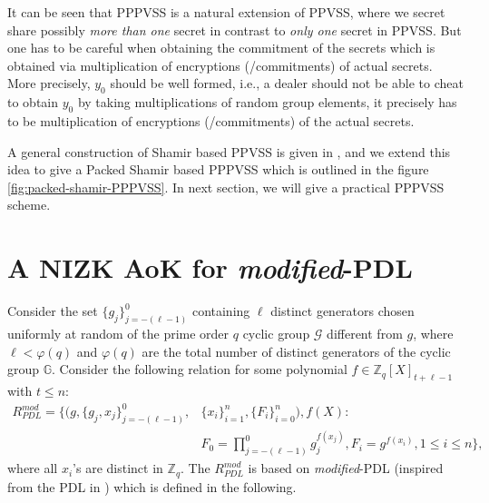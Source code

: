 It can be seen that PPPVSS is a natural extension of PPVSS, where we secret share possibly \textit{more than one} 
secret in contrast to \textit{only one} secret in PPVSS. But one has to be careful when obtaining the commitment 
of the secrets which is obtained via multiplication of encryptions (/commitments) of actual secrets. 
More precisely, $y_0$ should be well formed, i.e., a dealer should not be able to cheat to obtain $y_0$ by 
taking multiplications of random group elements, it precisely has to be multiplication of encryptions 
(/commitments) of the actual secrets.\par 

A general construction of Shamir based PPVSS is given in \cite{cryptoeprint:2025/576}, and we extend this idea 
to give a Packed Shamir based PPPVSS which is outlined in the figure \ref{fig:packed-shamir-PPPVSS}. 
In next section, we will give a practical PPPVSS scheme.



\section{A NIZK AoK for \textit{modified}-PDL}
\label{sec:aok_polynomial_dl}
Consider the set $\{g_j\}_{j=-(\ell-1)}^0$ containing $\ell$ distinct generators chosen uniformly at random of 
the prime order $q$ cyclic group $\mathcal{G}$ different from $g$, where $\ell<\varphi(q)$ and $\varphi(q)$ are 
the total number of distinct generators of the cyclic group $\mathbb{G}$. Consider the following relation for 
some polynomial $f\in\mathbb{Z}_q[X]_{t+\ell-1}$ with $t\leq n$:
\begin{align}\label{eq:relation_mod_PDL}
  R_{PDL}^{mod} = \{(g,\{g_j,x_j\}_{j=-(\ell-1)}^0,&\{x_i\}_{i=1}^n,\{F_i\}_{i=0}^n),f(X) :\nonumber\\
   &F_0=\prod_{j=-(\ell-1)}^{0}g_j^{f(x_j)}, F_i=g^{f(x_i)}, 1\leq i\leq n\},
\end{align}
where all $x_i$'s are distinct in $\mathbb{Z}_q$. The $R_{PDL}^{mod}$ is based on \textit{modified}-PDL (inspired from the PDL in \cite{cryptoeprint:2023/1669}) 
which is defined in the following.

